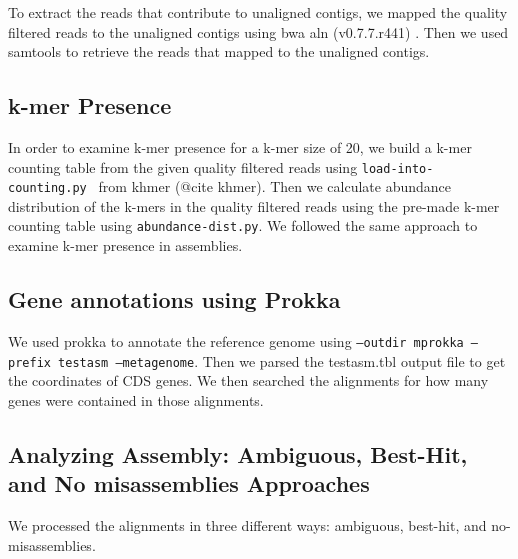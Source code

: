 \documentclass[10pt,a4paper,twocolumn]{article}
\begin{document}
To extract the reads that contribute to unaligned contigs, we mapped
the quality filtered reads to the unaligned contigs using bwa aln
(v0.7.7.r441) \cite{bwa}.  Then we used samtools to retrieve the reads
that mapped to the unaligned contigs.





\subsection*{k-mer Presence}
In order to examine k-mer presence for a k-mer size of 20, we build a
k-mer counting table from the given quality filtered reads using
{\tt{load-into-counting.py} } from khmer (@cite khmer). Then we
calculate abundance distribution of the k-mers in the quality filtered
reads using the pre-made k-mer counting table using
{\tt{abundance-dist.py}}. We followed the same approach to examine
k-mer presence in assemblies.

\subsection*{Gene annotations using Prokka}
We used prokka \cite{prokka} to annotate the reference genome using
{\tt{--outdir mprokka --prefix testasm --metagenome}}. Then we parsed
the testasm.tbl output file to get the coordinates of CDS genes. We then
searched the alignments for how many genes were contained in those
alignments.

\subsection*{Analyzing Assembly: Ambiguous, Best-Hit, and No misassemblies Approaches}
We processed the alignments in three different ways: ambiguous,
best-hit, and no-misassemblies.

\end{document}
